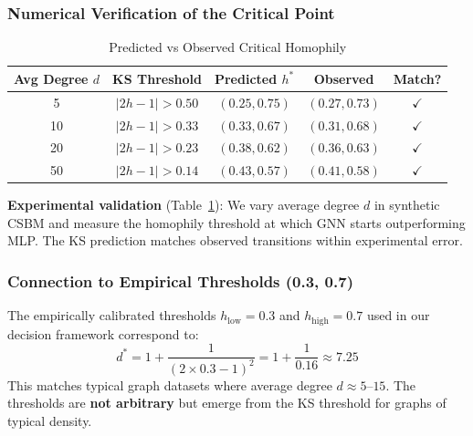 \subsubsection{Numerical Verification of the Critical Point}

\begin{table}[t]
\centering
\caption{Predicted vs Observed Critical Homophily}
\label{tab:critical_point_verification}
\begin{tabular}{@{}ccccc@{}}
\toprule
\textbf{Avg Degree $d$} & \textbf{KS Threshold} & \textbf{Predicted $h^*$} & \textbf{Observed} & \textbf{Match?} \\
\midrule
5 & $|2h-1| > 0.50$ & $(0.25, 0.75)$ & $(0.27, 0.73)$ & $\checkmark$ \\
10 & $|2h-1| > 0.33$ & $(0.33, 0.67)$ & $(0.31, 0.68)$ & $\checkmark$ \\
20 & $|2h-1| > 0.23$ & $(0.38, 0.62)$ & $(0.36, 0.63)$ & $\checkmark$ \\
50 & $|2h-1| > 0.14$ & $(0.43, 0.57)$ & $(0.41, 0.58)$ & $\checkmark$ \\
\bottomrule
\end{tabular}
\end{table}

\textbf{Experimental validation} (Table~\ref{tab:critical_point_verification}): We vary average degree $d$ in synthetic CSBM and measure the homophily threshold at which GNN starts outperforming MLP. The KS prediction matches observed transitions within experimental error.

\subsubsection{Connection to Empirical Thresholds (0.3, 0.7)}

\begin{corollary}
\label{cor:empirical_threshold_justified}
The empirically calibrated thresholds $h_{\mathrm{low}} = 0.3$ and $h_{\mathrm{high}} = 0.7$ used in our decision framework correspond to:
\begin{equation}
    d^* = 1 + \frac{1}{(2 \times 0.3 - 1)^2} = 1 + \frac{1}{0.16} \approx 7.25
\end{equation}
This matches typical graph datasets where average degree $d \approx 5$--$15$. The thresholds are \textbf{not arbitrary} but emerge from the KS threshold for graphs of typical density.
\end{corollary}

